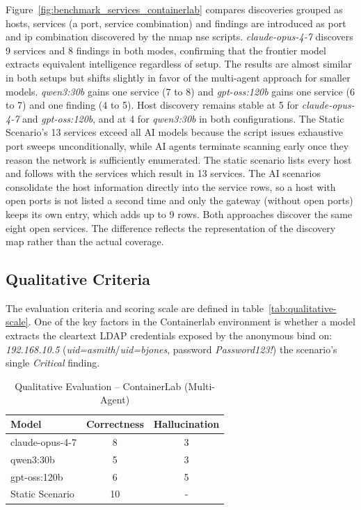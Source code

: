 Figure~\ref{fig:benchmark_services_containerlab} compares discoveries grouped as hosts, services (a port, service combination)
and findings are introduced as port and ip combination discovered by the nmap nse scripts.
\textit{claude-opus-4-7} discovers 9 services and 8 findings in both modes, confirming that
the frontier model extracts equivalent intelligence regardless of setup.
The results are almost similar in both setups but shifts slightly in favor of the multi-agent approach for smaller models.
\textit{qwen3:30b} gains one service (7 to 8) and \textit{gpt-oss:120b} gains one service
(6 to 7) and one finding (4 to 5).
Host discovery remains stable at 5 for \textit{claude-opus-4-7} and \textit{gpt-oss:120b},
and at 4 for \textit{qwen3:30b} in both configurations.
The Static Scenario's 13 services exceed all \gls{AI} models because the script issues
exhaustive port sweeps unconditionally, while \gls{AI} agents terminate scanning early
once they reason the network is sufficiently enumerated.
The static scenario lists every host and follows with the services which result in 13 services.
The \gls{AI} scenarios consolidate the host information directly into the service rows, so a host
with open ports is not listed a second time and only the gateway (without open ports) keeps its own
entry, which adds up to 9 rows.
Both approaches discover the same eight open services.
The difference reflects the representation of the discovery map rather than the actual coverage.


\subsection{Qualitative Criteria}\label{subsec:qualitativ-criteria-containerlab}

The evaluation criteria and scoring scale are defined in table~\ref{tab:qualitative-scale}.
One of the key factors in the \gls{Containerlab} environment is whether a model extracts the
cleartext \gls{LDAP} credentials exposed by the anonymous bind on:\\ \textit{192.168.10.5}
(\textit{uid=asmith}/\textit{uid=bjones}, password \textit{Password123!}) \textthreequartersemdash the scenario's
single \textit{Critical} finding.

\begin{table}[h]
    \centering
    \caption{Qualitative Evaluation -- ContainerLab (Multi-Agent)}
    \label{tab:qualitative-results-containerlab}
    \small
    \begin{tabular}{@{}lcc@{}}
        \toprule
        \textbf{Model}  & \textbf{Correctness} & \textbf{Hallucination} \\
        \midrule
        claude-opus-4-7 & 8                    & 3                      \\
        qwen3:30b       & 5                    & 3                      \\
        gpt-oss:120b    & 6                    & 5                      \\
        Static Scenario & 10                   & -                      \\
        \bottomrule
    \end{tabular}
\end{table}

